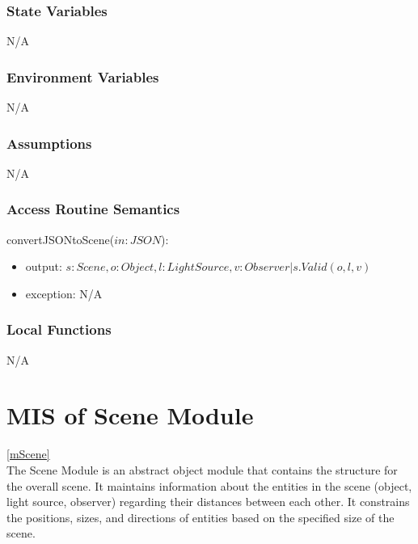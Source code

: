 \documentclass[12pt, titlepage]{article}
\begin{document}
\subsubsection{State Variables}
N/A

\subsubsection{Environment Variables}
N/A

\subsubsection{Assumptions}
N/A

\subsubsection{Access Routine Semantics}
\noindent convertJSONtoScene($in: JSON$):
\begin{itemize}
	\item output: $s : Scene, o : Object, l : LightSource , v: Observer | 
	s.Valid(o,l,v)$ %
	\item exception: N/A
\end{itemize}

\subsubsection{Local Functions}
N/A

\newpage

\section{MIS of Scene Module} \ref{mScene} \\
The Scene Module is an abstract object module that contains the structure for 
the overall scene. It maintains information about the entities in the scene 
(object, light source, observer) regarding their distances between each other. 
It constrains the positions, sizes, and directions of entities based on the 
specified size of the scene.
%
%
\end{document}
